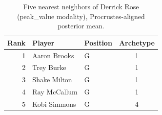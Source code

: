 \begin{table}[htbp]
  \centering\small
  \begin{tabular}{rllc}
    \toprule
    Rank & Player & Position & Archetype \\
    \midrule
    1 & Aaron Brooks & G & 1 \\
    2 & Trey Burke & G & 1 \\
    3 & Shake Milton & G & 1 \\
    4 & Ray McCallum & G & 1 \\
    5 & Kobi Simmons & G & 4 \\
    \bottomrule
  \end{tabular}
  \caption{Five nearest neighbors of Derrick Rose (peak_value modality), Procrustes-aligned posterior mean.}
  \label{tab:Derrick_Rose_neighbors_peak_value}
\end{table}

